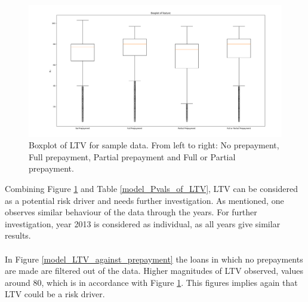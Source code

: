         \begin{figure}[H]
            \centering
            \includegraphics[width=\linewidth]{Figures/Boxplot_of_ltv_[2013, 2014, 2015, 2016, 2017, 2018, 2019, 2020]_.png}
            \caption{
                Boxplot of LTV for sample data.
                 From left to right: No prepayment, 
                 Full prepayment, Partial prepayment and Full or 
                 Partial prepayment.
                 }
            \label{model_boxplot_LTV}
        \end{figure}
        Combining Figure \ref{model_boxplot_LTV} and Table 
        \ref{model_Pvals_of_LTV}, LTV can be considered as a 
        potential risk driver and needs further investigation. As 
        mentioned, one observes similar behaviour of the data through 
        the years. For further investigation, year 2013 is considered 
        as individual, as all years give similar results.  
        \\\\
        In Figure \ref{model_LTV_against_prepayment} the loans in 
        which no prepayments are made are filtered out of the data. 
        Higher magnitudes of LTV  observed, values around 80, which is 
        in accordance with Figure \ref{model_boxplot_LTV}. This figures 
        implies again that LTV could be a risk driver. 
